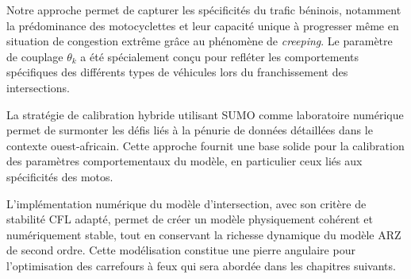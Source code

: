 Notre approche permet de capturer les spécificités du trafic béninois, notamment la prédominance des motocyclettes et leur capacité unique à progresser même en situation de congestion extrême grâce au phénomène de \textit{creeping}. Le paramètre de couplage $ \theta_k $ a été spécialement conçu pour refléter les comportements spécifiques des différents types de véhicules lors du franchissement des intersections.

La stratégie de calibration hybride utilisant SUMO comme laboratoire numérique permet de surmonter les défis liés à la pénurie de données détaillées dans le contexte ouest-africain. Cette approche fournit une base solide pour la calibration des paramètres comportementaux du modèle, en particulier ceux liés aux spécificités des motos.

L'implémentation numérique du modèle d'intersection, avec son critère de stabilité CFL adapté, permet de créer un modèle physiquement cohérent et numériquement stable, tout en conservant la richesse dynamique du modèle ARZ de second ordre. Cette modélisation constitue une pierre angulaire pour l'optimisation des carrefours à feux qui sera abordée dans les chapitres suivants.
